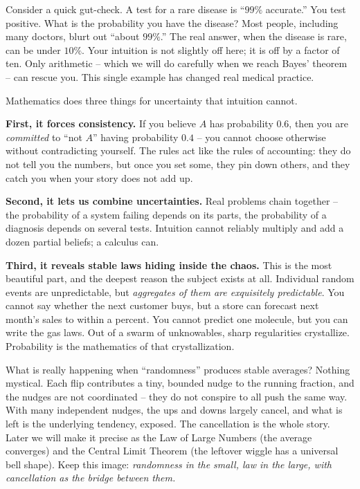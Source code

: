 \begin{intuitionbox}
Consider a quick gut-check. A test for a rare disease is ``$99\%$ accurate.'' You
test positive. What is the probability you have the disease? Most people, including
many doctors, blurt out ``about $99\%$.'' The real answer, when the disease is rare,
can be under $10\%$. Your intuition is not slightly off here; it is off by a factor
of ten. Only arithmetic -- which we will do carefully when we reach Bayes' theorem
-- can rescue you. This single example has changed real medical practice.
\end{intuitionbox}

Mathematics does three things for uncertainty that intuition cannot.

\textbf{First, it forces consistency.} If you believe $A$ has probability $0.6$,
then you are \emph{committed} to ``not $A$'' having probability $0.4$ -- you cannot
choose otherwise without contradicting yourself. The rules act like the rules of
accounting: they do not tell you the numbers, but once you set some, they pin down
others, and they catch you when your story does not add up.

\textbf{Second, it lets us combine uncertainties.} Real problems chain together --
the probability of a system failing depends on its parts, the probability of a
diagnosis depends on several tests. Intuition cannot reliably multiply and add a
dozen partial beliefs; a calculus can.

\textbf{Third, it reveals stable laws hiding inside the chaos.} This is the most
beautiful part, and the deepest reason the subject exists at all. Individual random
events are unpredictable, but \emph{aggregates of them are exquisitely
predictable}. You cannot say whether the next customer buys, but a store can
forecast next month's sales to within a percent. You cannot predict one molecule,
but you can write the gas laws. Out of a swarm of unknowables, sharp regularities
crystallize. Probability is the mathematics of that crystallization.

\begin{happeningbox}
What is really happening when ``randomness'' produces stable averages? Nothing
mystical. Each flip contributes a tiny, bounded nudge to the running fraction, and
the nudges are not coordinated -- they do not conspire to all push the same way.
With many independent nudges, the ups and downs largely cancel, and what is left is
the underlying tendency, exposed. The cancellation is the whole story. Later we
will make it precise as the Law of Large Numbers (the average converges) and the
Central Limit Theorem (the leftover wiggle has a universal bell shape). Keep this
image: \emph{randomness in the small, law in the large, with cancellation as the
bridge between them.}
\end{happeningbox}

